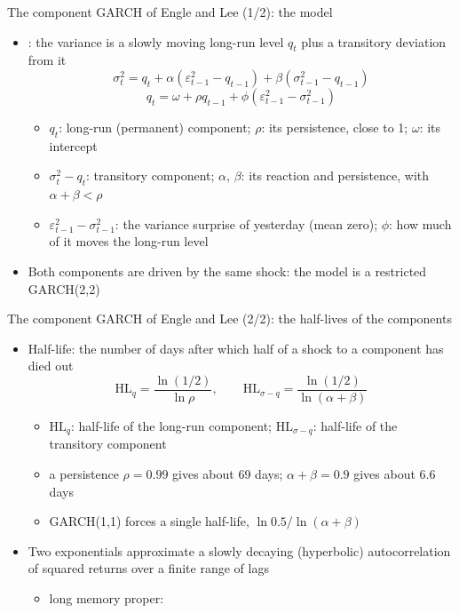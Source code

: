 \begin{frame}{The component GARCH of Engle and Lee (1/2): the model}
\itemsize{\small}
\begin{itemize}
    \item {}: the variance is a slowly moving long-run level $q_t$ plus a transitory deviation from it
    \[ \sigma^2_t = q_t + \alpha(\varepsilon^2_{t-1} - q_{t-1}) + \beta(\sigma^2_{t-1} - q_{t-1}) \]
    \[ q_t = \omega + \rho q_{t-1} + \phi(\varepsilon^2_{t-1} - \sigma^2_{t-1}) \]
    \begin{itemize}
        \item $q_t$: long-run (permanent) component; $\rho$: its persistence, close to 1; $\omega$: its intercept
        \item $\sigma^2_t - q_t$: transitory component; $\alpha$, $\beta$: its reaction and persistence, with $\alpha + \beta < \rho$
        \item $\varepsilon^2_{t-1} - \sigma^2_{t-1}$: the variance surprise of yesterday (mean zero); $\phi$: how much of it moves the long-run level
    \end{itemize}
    \item Both components are driven by the same shock: the model is a restricted GARCH(2,2)
\end{itemize}
\end{frame}

\begin{frame}{The component GARCH of Engle and Lee (2/2): the half-lives of the components}
\itemsize{\small}
\begin{itemize}
    \item Half-life: the number of days after which half of a shock to a component has died out
    \[ \mathrm{HL}_q = \frac{\ln(1/2)}{\ln\rho}, \qquad \mathrm{HL}_{\sigma - q} = \frac{\ln(1/2)}{\ln(\alpha + \beta)} \]
    \begin{itemize}
        \item $\mathrm{HL}_q$: half-life of the long-run component; $\mathrm{HL}_{\sigma - q}$: half-life of the transitory component
        \item a persistence $\rho = 0.99$ gives about 69 days; $\alpha + \beta = 0.9$ gives about 6.6 days
        \item GARCH(1,1) forces a single half-life, $\ln 0.5/\ln(\alpha + \beta)$
    \end{itemize}
    \item Two exponentials approximate a slowly decaying (hyperbolic) autocorrelation of squared returns over a finite range of lags
    \begin{itemize}
        \item long memory proper: 
    \end{itemize}
\end{itemize}
\end{frame}

